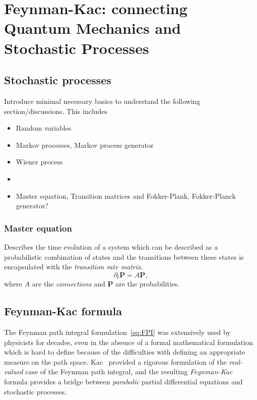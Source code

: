 \newpage
\section[The Feynman-Kac formula]{Feynman-Kac: connecting Quantum Mechanics and Stochastic Processes}
\label{subsec:FK}

\subsection{Stochastic processes}
\label{subsec:fk-stoch}


Introduce minimal necessary basics to understand the following section/discussions. This includes
\begin{itemize}
	\item Random variables
	\item Markov processes, Markov process generator
	\item Wiener process
	\item 
	\item Master equation, Transition matrices and Fokker-Plank, Fokker-Planck generator?
\end{itemize}

\subsubsection{Master equation}
Describes the time evolution of a system which can be described as a probabilistic combination of states and the transitions between these states is encapsulated with the \emph{transition rate matrix}.
\begin{equation}
	\partial_{t} \mathbf{P} = A \mathbf{P},
\end{equation}
where $A$ are the \emph{connections} and $\mathbf{P}$ are the probabilities.  

\subsection{Feynman-Kac formula}
\label{subsec:fk-fk}
The Feynman path integral formulation~\eqref{eq:FPI} was extensively used by physicists for decades, even in the absence of a formal mathematical formulation which is hard to define because of the difficulties with defining an appropriate measure on the path space. Kac~\cite{kac1949distributions} provided a rigorous formulation of the \textit{real-valued} case of the Feynman path integral, and the resulting \emph{Feynman-Kac} formula provides a bridge between \emph{parabolic} partial differential equations and stochastic processes.

